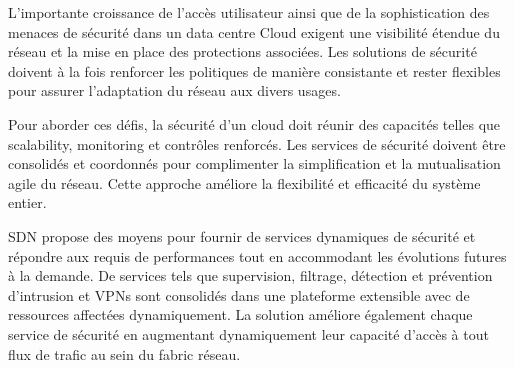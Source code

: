 L'importante croissance de l'accès utilisateur ainsi que de la sophistication des menaces de sécurité dans un data centre Cloud exigent une visibilité étendue du réseau et la mise en place des protections associées. Les solutions de sécurité doivent à la fois renforcer les politiques de manière consistante et rester flexibles pour assurer l'adaptation du réseau aux divers usages.


Pour aborder ces défis, la sécurité d'un cloud doit réunir des capacités telles que \gls{scalability}, monitoring et contrôles renforcés. Les services de sécurité doivent être consolidés et coordonnés pour complimenter la simplification  et la mutualisation agile du réseau. Cette approche améliore la flexibilité et efficacité du système entier.

SDN propose des moyens pour fournir de services dynamiques de sécurité et répondre aux requis de performances tout en accommodant les évolutions futures à la demande. De services tels que supervision, filtrage, détection et prévention d'intrusion et VPNs sont consolidés dans une plateforme extensible avec de ressources affectées dynamiquement. La solution améliore également chaque service de sécurité en augmentant dynamiquement leur capacité d'accès à tout flux de trafic au sein du \gls{fabric} réseau.


